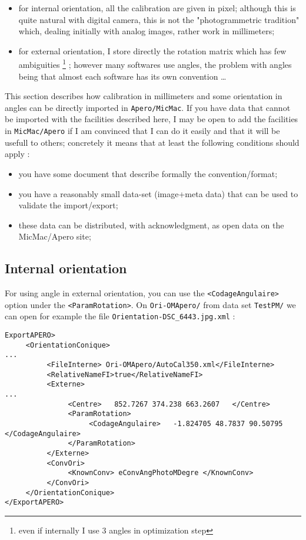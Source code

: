 \begin{itemize}
    \item for internal orientation, all the calibration are given in pixel;
          although this is quite natural with digital camera, this is
          not the "photogrammetric tradition" which, dealing initially with
          analog images, rather work in millimeters;

    \item for external orientation, I store directly the rotation matrix which
          has few ambiguities \footnote{even if internally I use $3$ angles in
          optimization step} ; however many softwares use angles, the problem
          with angles being that almost each software has its own convention \dots
\end{itemize}

This section describes how calibration in millimeters and some orientation in angles
can be directly imported in {\tt Apero/MicMac}. If you have data that cannot be
imported with the facilities described here, I may be open to add the facilities in
{\tt MicMac/Apero} if I am convinced that I can do it easily and that it will
be usefull to others; concretely it means that at least the following conditions should apply :

\begin{itemize}
      \item  you have some document that describe formally the convention/format;
      \item  you have a reasonably small data-set (image+meta data) that can  be used
             to validate the import/export;
      \item  these data can be distributed, with acknowledgment, as open data on the
             MicMac/Apero site;
\end{itemize}

\subsection{Internal orientation}

For using angle in external orientation, you can use the {\tt  <CodageAngulaire> }
option under the {\tt <ParamRotation>}. On {\tt Ori-OMApero/} from data set
{\tt TestPM/} we can open for example the file {\tt Orientation-DSC\_6443.jpg.xml} :

\begin{verbatim}
ExportAPERO>
     <OrientationConique>
...
          <FileInterne> Ori-OMApero/AutoCal350.xml</FileInterne>
          <RelativeNameFI>true</RelativeNameFI>
          <Externe>
...
               <Centre>   852.7267 374.238 663.2607   </Centre>
               <ParamRotation>
                    <CodageAngulaire>   -1.824705 48.7837 90.50795 </CodageAngulaire>
               </ParamRotation>
          </Externe>
          <ConvOri>
               <KnownConv> eConvAngPhotoMDegre </KnownConv>
          </ConvOri>
     </OrientationConique>
</ExportAPERO>

\end{verbatim}

